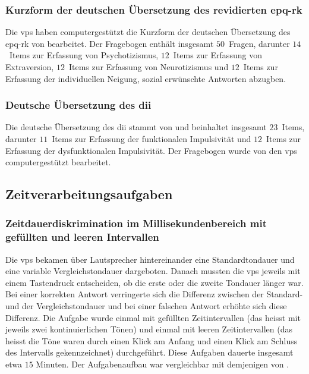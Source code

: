 \documentclass[11pt, twoside, a4paper]{book}		%
\begin{document}
\subsubsection*{Kurzform der deutschen Übersetzung des revidierten \gls{epq-rk}}
Die \glspl{vp} haben  computergestützt die Kurzform der deutschen Übersetzung des \gls{epq-rk} von \citet{Ruch1999} bearbeitet. Der Fragebogen enthält insgesamt $50$~Fragen, darunter $14$~Items zur Erfassung von Psychotizismus, $12$~Items zur Erfassung von Extraversion, $12$~Items zur Erfassung von Neurotizismus und $12$~Items zur Erfassung der individuellen Neigung, sozial erwünschte Antworten abzugben.

\subsubsection*{Deutsche Übersetzung des \gls{dii}}
Die deutsche Übersetzung des \gls{dii} stammt von \citet{Kuhmann1996} und beinhaltet insgesamt $23$~Items, darunter $11$~Items zur Erfassung der funktionalen Impulsivität und  $12$~Items zur Erfassung der dysfunktionalen Impulsivität. Der Fragebogen wurde von den \glspl{vp} computergestützt bearbeitet.

\subsection{Zeitverarbeitungsaufgaben}


\subsubsection*{Zeitdauerdiskrimination im Millisekundenbereich mit gefüllten und leeren Intervallen}

Die \glspl{vp} bekamen über Lautsprecher hintereinander eine Standardtondauer und eine variable Vergleichstondauer dargeboten. Danach mussten die \glspl{vp} jeweils mit einem Tastendruck entscheiden, ob die erste oder die zweite Tondauer länger war. Bei einer korrekten Antwort verringerte sich die Differenz zwischen der Standard- und der Vergleichstondauer und bei einer falschen Antwort erhöhte sich diese Differenz. Die Aufgabe wurde einmal mit gefüllten Zeitintervallen (das heisst mit jeweils zwei kontinuierlichen Tönen) und einmal mit leeren Zeitintervallen (das heisst die Töne waren durch einen Klick am Anfang und einen Klick am Schluss des Intervalls gekennzeichnet) durchgeführt. Diese Aufgaben dauerte insgesamt etwa $15$ Minuten. Der Aufgabenaufbau war vergleichbar mit demjenigen von \citet{Stauffer2011}. 
\end{document}
